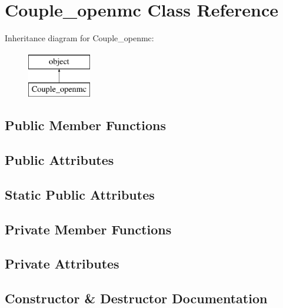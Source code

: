 \hypertarget{classopenbu_1_1couple_1_1couple__openmc_1_1_couple__openmc}{}\section{Couple\+\_\+openmc Class Reference}
\label{classopenbu_1_1couple_1_1couple__openmc_1_1_couple__openmc}
Inheritance diagram for Couple\+\_\+openmc\+:\begin{figure}[H]
\begin{center}
\leavevmode
\includegraphics[height=2.000000cm]{classopenbu_1_1couple_1_1couple__openmc_1_1_couple__openmc}
\end{center}
\end{figure}
\subsection*{Public Member Functions}
\subsection*{Public Attributes}
\subsection*{Static Public Attributes}
\subsection*{Private Member Functions}
\subsection*{Private Attributes}


\subsection{Constructor \& Destructor Documentation}
\mbox{\label{classopenbu_1_1couple_1_1couple__openmc_1_1_couple__openmc_adf43c036ad3b3850d41894aa20f4bd55}} 
